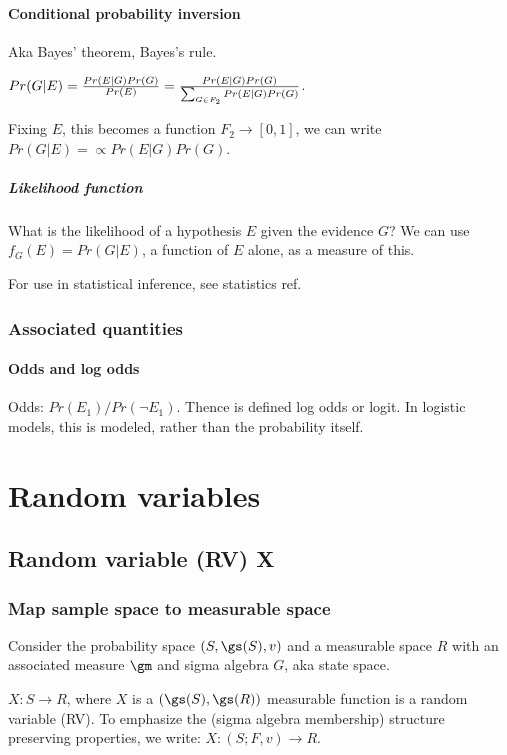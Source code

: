 \documentclass[oneside, article]{memoir}
\begin{document}
\subsection{Conditional probability inversion}
Aka Bayes' theorem, Bayes's rule.

$Pr(G | E) = \frac{Pr(E|G)Pr(G)}{Pr(E)} \\
= \frac{Pr(E|G)Pr(G)}{\sum_{G \in F_2} Pr(E|G)Pr(G)}$.

Fixing $E$, this becomes a function $F_2 \to [0, 1]$, we can write $Pr(G|E) = \propto Pr(E|G)Pr(G)$.

\subsubsection{Likelihood function}
What is the likelihood of a hypothesis $E$ given the evidence $G$? We can use $f_G(E) = Pr(G|E)$, a function of $E$ alone, as a measure of this.

For use in statistical inference, see statistics ref.


\section{Associated quantities}
\subsection{Odds and log odds}
Odds: $Pr(E_1)/ Pr(\lnot E_1)$. Thence is defined log odds or logit. In logistic models, this is modeled, rather than the probability itself.

\part{Random variables}
\chapter{Random variable (RV) X}
\section{Map sample space to measurable space}
Consider the probability space $(S, \gs(S), v)$ and a measurable space $R$ with an associated measure $\gm$ and sigma algebra $G$, aka state space.

$X:S \to R$, where $X$ is a $(\gs(S), \gs(R))$ measurable function is a random variable (RV). To emphasize the (sigma algebra membership) structure preserving properties, we write: $X:(S; F, v) \to R$.
\end{document}
